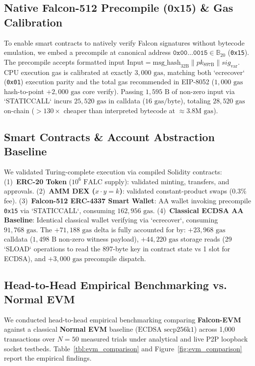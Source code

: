 \documentclass[a4paper,fleqn]{cas-dc}
\begin{document}
\subsection{Native Falcon-512 Precompile (0x15) \& Gas Calibration}
To enable smart contracts to natively verify Falcon signatures without bytecode emulation, we embed a precompile at canonical address $\mathtt{0x00\dots0015} \in \mathbb{B}_{20}$ (\texttt{0x15}). The precompile accepts formatted input $\text{Input} = \text{msg\_hash}_{32\text{B}} \parallel pk_{897\text{B}} \parallel sig_{\text{var}}$.
CPU execution gas is calibrated at exactly \textbf{$3,000\text{ gas}$}, matching both `ecrecover` (\texttt{0x01}) execution parity and the total gas recommended in EIP-8052 \citep{dubois2025eip8052} ($1,000\text{ gas}$ hash-to-point $+ 2,000\text{ gas}$ core verify). Passing $1,595\text{ B}$ of non-zero input via `STATICCALL` incurs $25,520\text{ gas}$ in calldata ($16\text{ gas/byte}$), totaling \textbf{$28,520\text{ gas}$} on-chain ($>130\times$ cheaper than interpreted bytecode at $\approx 3.8\text{M gas}$).

\subsection{Smart Contracts \& Account Abstraction Baseline}
We validated Turing-complete execution via compiled Solidity contracts:
(1)~\textbf{ERC-20 Token} ($10^6\text{ FALC}$ supply): validated minting, transfers, and approvals.
(2)~\textbf{AMM DEX ($x \cdot y = k$)}: validated constant-product swaps ($0.3\%$ fee).
(3)~\textbf{Falcon-512 ERC-4337 Smart Wallet}: AA wallet invoking precompile \texttt{0x15} via `STATICCALL`, consuming \textbf{$162,956\text{ gas}$}.
(4)~\textbf{Classical ECDSA AA Baseline}: Identical classical wallet verifying via `ecrecover`, consuming \textbf{$91,768\text{ gas}$}. The $+71,188\text{ gas}$ delta is fully accounted for by: $+23,968\text{ gas}$ calldata ($1,498\text{ B}$ non-zero witness payload), $+44,220\text{ gas}$ storage reads (29 `SLOAD` operations to read the 897-byte key in contract state vs 1 slot for ECDSA), and $+3,000\text{ gas}$ precompile dispatch.

\subsection{Head-to-Head Empirical Benchmarking vs. Normal EVM}
We conducted head-to-head empirical benchmarking comparing \textbf{Falcon-EVM} against a classical \textbf{Normal EVM} baseline ($\text{ECDSA secp256k1}$) across 1,000 transactions over $N = 50$ measured trials under analytical and live P2P loopback socket testbeds. Table~\ref{tbl:evm_comparison} and Figure~\ref{fig:evm_comparison} report the empirical findings.
\end{document}
